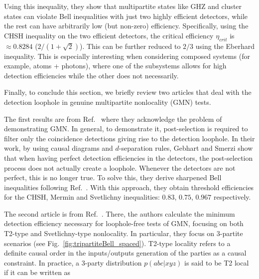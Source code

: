\documentclass[aps,pra,reprint, superscriptaddress,showkeys]{revtex4-2}
\theoremstyle{plain}
\begin{document}
Using this inequality, they show that multipartite states like GHZ and cluster states can violate Bell inequalities with just two highly efficient detectors, while the rest can have arbitrarily low (but non-zero) efficiency. Specifically, using the CHSH inequality on the two efficient detectors, the critical efficiency $\eta_{crit}$ is $\approx 0.8284$ ($2/(1+\sqrt{2})$). This can be further reduced to $2/3$ using the Eberhard inequality. This is especially interesting when considering composed systems (for example, atoms + photons), where one of the subsystems allows for high detection efficiencies while the other does not necessarily. 

Finally, to conclude this section, we briefly review two articles that deal with the detection loophole in genuine multipartite nonlocality (GMN) tests. 

The first results are from  Ref.~\cite{Gebhart_2022_GMN} where they acknowledge the problem of demonstrating GMN. In general, to demonstrate it, post-selection is required to filter only the coincidence detections giving rise to the detection loophole. In their work, by using causal diagrams and $d$-separation rules,  Gebhart and Smerzi show that when having perfect detection efficiencies in the detectors, the post-selection process does not actually create a loophole. Whenever the detectors are not perfect, this is no longer true. To solve this,  they derive sharpened Bell inequalities following Ref.~\cite{Larsson_Bell}. With this approach, they obtain threshold efficiencies for the CHSH, Mermin and Svetlichny inequalities: $0.83$, $0.75$, $0.967$ respectively.

The second article is from Ref.~\cite{efficiencies_Subhendu_2024}. There, the authors calculate the minimum detection efficiency necessary for loophole-free tests of GMN, focusing on both T2-type and Svetlichny-type nonlocality. In particular, they focus on $3$-partite scenarios  (see Fig.~\ref{fig:tripartiteBell_spaced}).  
T2-type locality refers to a definite causal order in the inputs/outputs generation of the parties as a causal constraint. In practice, a 3-party distribution  $p(abc|xyz)$ is said to be T2 local if it can be written as 
\end{document}
